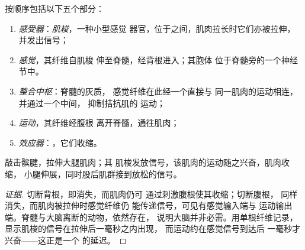 \begin{proposition}[牵张反射的回路]\label{prop:g12:stretch-reflex:arc}
按顺序包括以下五个部分：
\begin{enumerate}
  \item \emph{感受器}：\emph{肌梭}，一种小型感觉
        器官，位于之间，肌肉拉长时它们亦被拉伸，
        并发出信号；
  \item \emph{感觉}，其纤维自肌梭
        伸至脊髓，经背根进入；其胞体
        位于脊髓旁的一个神经节中。
  \item \emph{整合中枢}：脊髓的灰质，
        感觉纤维在此经一个直接与
        同一肌肉的运动相连，并通过一个中间，
        抑制拮抗肌的
        运动；
  \item \emph{运动}，其纤维经腹根
        离开脊髓，通往肌肉；
  \item \emph{效应器}：，它们收缩。
\end{enumerate}
敲击髌腱，拉伸大腿肌肉；其
肌梭发放信号，该肌肉的运动随之兴奋，肌肉收缩，
小腿伸展，同时股后肌群接到放松的信号。
\end{proposition}
\begin{proof}[证据]
切断背根，即消失，而肌肉仍可
通过刺激腹根使其收缩；切断腹根，
同样消失，而肌肉被拉伸时感觉纤维仍
能传递信号，可见有感觉输入端与
运动输出端。脊髓与大脑离断的动物，依然存在，
说明大脑并非必需。用单根纤维记录，
显示肌梭的信号在拉伸后一毫秒之内出现，
而运动约在感觉信号到达后
一毫秒才兴奋——这正是一个
的延迟。
\end{proof}

